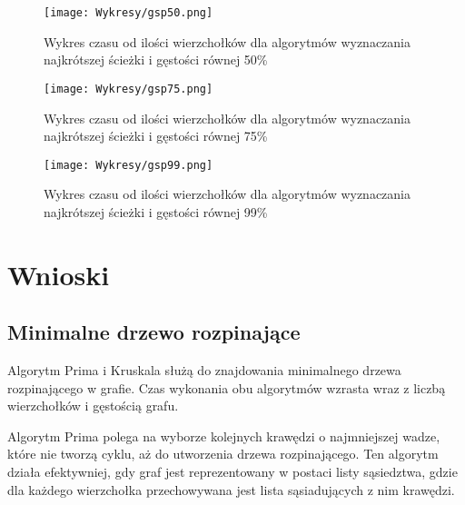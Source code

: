 \documentclass{article}
\begin{document}
            \begin{figure}[H]
                \centering
                \texttt{[image: Wykresy/gsp50.png]}
                \caption{Wykres czasu od ilości wierzchołków dla algorytmów wyznaczania najkrótszej ścieżki i gęstości równej 50\%}
            \end{figure}

            \begin{figure}[H]
                \centering
                \texttt{[image: Wykresy/gsp75.png]}
                \caption{Wykres czasu od ilości wierzchołków dla algorytmów wyznaczania najkrótszej ścieżki i gęstości równej 75\%}
            \end{figure}

            \begin{figure}[H]
                \centering
                \texttt{[image: Wykresy/gsp99.png]}
                \caption{Wykres czasu od ilości wierzchołków dla algorytmów wyznaczania najkrótszej ścieżki i gęstości równej 99\%}
            \end{figure}

\section{Wnioski}


    \subsection{Minimalne drzewo rozpinające}
        Algorytm Prima i Kruskala służą do znajdowania minimalnego drzewa rozpinającego w grafie. 
        Czas wykonania obu algorytmów wzrasta wraz z liczbą wierzchołków i gęstością grafu.

        Algorytm Prima polega na wyborze kolejnych krawędzi o najmniejszej wadze, które nie tworzą cyklu, aż do utworzenia drzewa rozpinającego. 
        Ten algorytm działa efektywniej, gdy graf jest reprezentowany w postaci listy sąsiedztwa, gdzie dla każdego wierzchołka przechowywana jest lista sąsiadujących z nim krawędzi.
\end{document}
